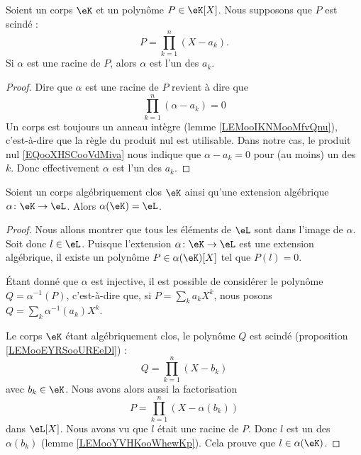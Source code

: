 \begin{lemma}       \label{LEMooYVHKooWhewKp}
	Soient un corps \( \eK\) et un polynôme \( P\in \eK[X]\). Nous supposons que \( P\) est scindé :
	\begin{equation}
		P=\prod_{k=1}^n(X-a_k).
	\end{equation}
	Si \( \alpha\) est une racine de \( P\), alors \( \alpha\) est l'un des \( a_k\).
\end{lemma}

\begin{proof}
	Dire que \( \alpha\) est une racine de \( P\) revient à dire que
	\begin{equation}        \label{EQooXHSCooVdMiva}
		\prod_{k=1}^n(\alpha-a_k)=0
	\end{equation}
	Un corps est toujours un anneau intègre (lemme \ref{LEMooIKNMooMfvQnu}), c'est-à-dire que la règle du produit nul est utilisable. Dans notre cas, le produit nul \eqref{EQooXHSCooVdMiva} nous indique que \( \alpha-a_k=0\) pour (au moins) un des \( k\). Donc effectivement \( \alpha\) est l'un des \( a_k\).
\end{proof}

\begin{lemma}
	Soient un corps algébriquement clos \( \eK\) ainsi qu'une extension algébrique \( \alpha\colon \eK\to \eL\). Alors \( \alpha(\eK)=\eL\).
\end{lemma}

\begin{proof}
	Nous allons montrer que tous les éléments de \( \eL\) sont dans l'image de \( \alpha\). Soit donc \( l\in \eL\). Puisque l'extension \( \alpha\colon \eK\to \eL\) est une extension algébrique, il existe un polynôme \( P\in \alpha(\eK)[X]\) tel que \( P(l)=0\).

	Étant donné que \( \alpha\) est injective, il est possible de considérer le polynôme \( Q=\alpha^{-1}(P)\), c'est-à-dire que, si \( P=\sum_ka_kX^k\), nous posons \( Q=\sum_k\alpha^{-1}(a_k)X^k\).

	Le corps \( \eK\) étant algébriquement clos, le polynôme \( Q\) est scindé (proposition \ref{LEMooEYRSooUREeDl}) :
	\begin{equation}
		Q=\prod_{k=1}^n(X-b_k)
	\end{equation}
	avec \( b_k\in \eK\). Nous avons alors aussi la factorisation
	\begin{equation}
		P=\prod_{k=1}^n(X-\alpha(b_k))
	\end{equation}
	dans \( \eL[X]\). Nous avons vu que \( l\) était une racine de \( P\). Donc \( l\) est un des \( \alpha(b_k)\) (lemme \ref{LEMooYVHKooWhewKp}). Cela prouve que \( l\in \alpha(\eK)\).
\end{proof}

